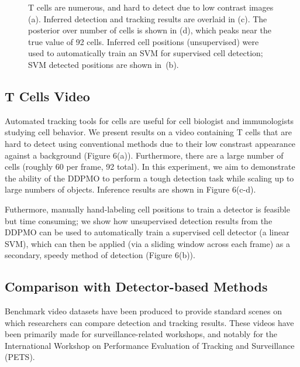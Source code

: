 \documentclass{article}
\begin{document}
\begin{figure}[h!tbp]
        \caption{\label{fig:antsFig} T cells are numerous, and hard to detect due to low contrast images (a). Inferred detection and tracking results are overlaid in (c). The posterior over number of cells is shown in (d), which peaks near the true value of 92 cells. Inferred cell positions (unsupervised) were used to automatically train an SVM for supervised cell detection; SVM detected positions are shown in~(b).}
\end{figure}

\subsection{T Cells Video}
Automated tracking tools for cells are useful for cell biologist and immunologists studying cell behavior. We present results on a video containing T cells that are hard to detect using conventional methods due to their low constrast appearance against a background (Figure 6(a)). Furthermore, there are a large number of cells (roughly 60 per frame, 92 total). In this experiment, we aim to demonstrate the ability of the DDPMO to perform a tough detection task while scaling up to large numbers of objects. Inference results are shown in Figure 6(c-d).

Futhermore, manually hand-labeling cell positions to train a detector is feasible but time consuming; we show how unsupervised detection results from the DDPMO can be used to automatically train a supervised cell detector (a linear SVM), which can then be applied (via a sliding window across each frame) as a secondary, speedy method of detection (Figure 6(b)).

\subsection{Comparison with Detector-based Methods}
Benchmark video datasets have been produced to provide standard scenes on which researchers can compare detection and tracking results. These videos have been primarily made for surveillance-related workshops, and notably for the International Workshop on Performance Evaluation of Tracking and Surveillance (PETS).
\end{document}
